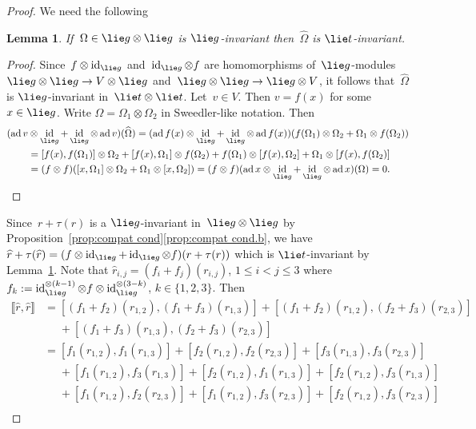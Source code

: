 \documentclass[12pt, reqno]{amsart}
\newcommand{\cybe}[1]{\mathbb{\Lbrack}#1,#1\mathbb{\Rbrack}}
\newcommand{\wh}[1]{\widehat{#1}}
\newtheorem{lemma}[theorem]{Lemma}
\theoremstyle{definition}
\numberwithin{equation}{section}
\newcommand{\tensor}{\otimes}
\DeclareMathOperator{\id}{id}
\DeclareMathOperator{\ad}{ad}
\begin{document}
\begin{proof}
We need the following
\begin{lemma}\label{lem:main cas Takiff}
If~$\Omega\in \lie g\tensor\lie g$ is $\lie g$-invariant
then~$\wh\Omega$
is $\lie t$-invariant. 
\end{lemma}
\begin{proof}
Since~$f\tensor\id_{\lie g}$ and~$\id_{\lie g}\tensor f$ are homomorphisms of~$\lie g$-modules
$\lie g\tensor\lie g\to V\tensor \lie g$ and~$\lie g\tensor \lie g\to \lie g\tensor V$, it follows that~$\wh{\Omega}$ is $\lie g$-invariant in~$\lie t\tensor\lie t$. Let~$v\in V$. Then $v=f(x)$ for some~$x\in\lie g$. Write $\Omega=\Omega_1\tensor \Omega_2$ in Sweedler-like notation. Then 
\begin{align*}
(\ad v&\tensor \id_{\lie g}+\id_{\lie g} \tensor \ad v)(\wh{\Omega})=(\ad f(x)\tensor \id_{\lie g}+\id_{\lie g}\tensor\ad f(x))(f(\Omega_1)\tensor \Omega_2+\Omega_1\tensor f(\Omega_2))\\
&=[f(x),f(\Omega_1)]\tensor \Omega_2+[f(x),\Omega_1]\tensor f(\Omega_2)
+f(\Omega_1)\tensor [f(x),\Omega_2]+\Omega_1\tensor [f(x),f(\Omega_2)]\\
&=(f\tensor f)([x,\Omega_1]\tensor \Omega_2+\Omega_1\tensor [x,\Omega_2])=(f\tensor f)(\ad x\tensor\id_{\lie g}+\id_{\lie g}\tensor\ad x)(\Omega)=0.\qedhere
\end{align*}
\end{proof}
Since~$r+\tau(r)$ is a $\lie g$-invariant in~$\lie g\tensor\lie g$
by Proposition~\ref{prop:compat cond}\ref{prop:compat cond.b}, we have $\wh{r}+\tau(\wh{r})=(f\tensor \id_{\lie g}+\id_{\lie g}\tensor f)(r+\tau(r))$ which is $\lie t$-invariant by Lemma~\ref{lem:main cas Takiff}. Note that 
$\wh{r}_{i,j}=(f_i+f_j)(r_{i,j})$, $1\le i<j\le 3$ where
$f_k:=\id_{\lie g}^{\tensor(k-1)}
\tensor f\tensor\id_{\lie g}^{\tensor(3-k)}$, $k\in\{1,2,3\}$.
Then
\begin{align*}
\cybe{\wh{r}}
&=[(f_1+f_2)(r_{1,2}),
(f_1+f_3)(r_{1,3})]+[(f_1+f_2)(r_{1,2}),
(f_2+f_3)(r_{2,3})]\\
&\phantom{=}+[(f_1+f_3)(r_{1,3}),
(f_2+f_3)(r_{2,3})]\\
&=[f_1(r_{1,2}),f_1(r_{1,3})]+
[f_2(r_{1,2}),f_2(r_{2,3})]+
[f_3(r_{1,3}),f_3(r_{2,3})]\\
&\phantom{=}
+[f_1(r_{1,2}),
f_3(r_{1,3})]+[f_2(r_{1,2}),
f_1(r_{1,3})]+[f_2(r_{1,2}),
f_3(r_{1,3})]\\
&\phantom{=}+[f_1(r_{1,2}),
f_2(r_{2,3})]+[f_1(r_{1,2}),
f_3(r_{2,3})]+[f_2(r_{1,2}),
f_3(r_{2,3})]\\

\end{align*}
\end{proof}
\end{document}
